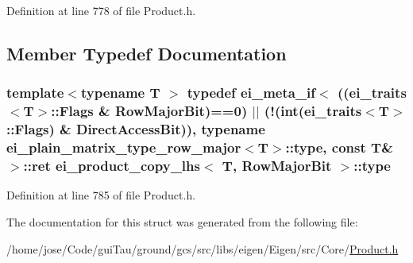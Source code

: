 Definition at line 778 of file Product.\-h.



\subsection{Member Typedef Documentation}
\hypertarget{structei__product__copy__lhs_3_01_t_00_01_row_major_bit_01_4_ae94777967be0382daa931ac3d428d047}{
\subsubsection[{type}]{\setlength{\rightskip}{0pt plus 5cm}template$<$typename T $>$ typedef {\bf ei\-\_\-meta\-\_\-if}$<$ (({\bf ei\-\_\-traits}$<$T$>$\-::Flags \& {\bf Row\-Major\-Bit})==0) $|$$|$ (!({\bf int}({\bf ei\-\_\-traits}$<$T$>$\-::Flags) \& {\bf Direct\-Access\-Bit})), typename {\bf ei\-\_\-plain\-\_\-matrix\-\_\-type\-\_\-row\-\_\-major}$<$T$>$\-::{\bf type}, const T\& $>$\-::{\bf ret} {\bf ei\-\_\-product\-\_\-copy\-\_\-lhs}$<$ T, {\bf Row\-Major\-Bit} $>$\-::{\bf type}}}\label{structei__product__copy__lhs_3_01_t_00_01_row_major_bit_01_4_ae94777967be0382daa931ac3d428d047}


Definition at line 785 of file Product.\-h.



The documentation for this struct was generated from the following file\-:\begin{DoxyCompactItemize}
\item 
/home/jose/\-Code/gui\-Tau/ground/gcs/src/libs/eigen/\-Eigen/src/\-Core/\hyperlink{_product_8h}{Product.\-h}\end{DoxyCompactItemize}
